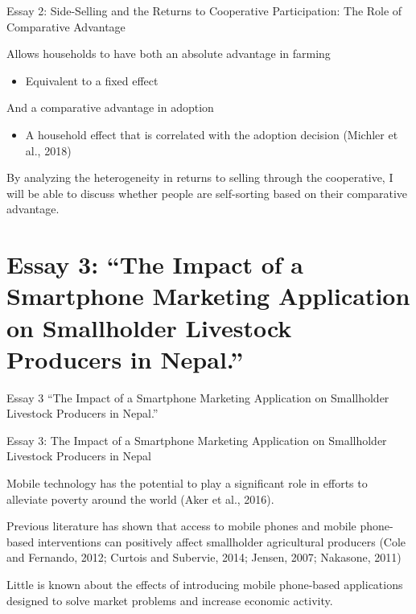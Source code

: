 \documentclass[aspectratio=169]{beamer}
\newenvironment{wideitemize}{\itemize\addtolength{\itemsep}{10pt}}{\enditemize}
\begin{document}
\begin{frame}{Essay 2: Side-Selling and the Returns to Cooperative Participation: The Role of Comparative Advantage}
    \begin{wideitemize}
        \item Allows households to have both an absolute advantage in farming  \vspace{.25cm}
            \begin{itemize}
                \item Equivalent to a fixed effect
            \end{itemize}
        \item And a comparative advantage in adoption  \vspace{.25cm}
            \begin{itemize}
                \item A household effect that is correlated with the adoption decision (Michler et al., 2018)
            \end{itemize}
        \item By analyzing the heterogeneity in returns to selling through the cooperative, I will be able to discuss whether people are self-sorting based on their comparative advantage.    
    \end{wideitemize}
\end{frame}


\section{Essay 3: ``The Impact of a Smartphone Marketing Application on Smallholder Livestock Producers in Nepal.''}

\begin{frame}{Essay 3}
\centering
\Large{``The Impact of a Smartphone Marketing Application on Smallholder Livestock Producers in Nepal.''}
\end{frame}


\begin{frame}{Essay 3: The Impact of a Smartphone Marketing Application on Smallholder Livestock Producers in Nepal}

    \begin{wideitemize}
        \item Mobile technology has the potential to play a significant role in efforts to alleviate poverty
around the world (Aker et al., 2016).
        \item Previous literature has shown that access to mobile phones and mobile phone-based interventions can positively affect smallholder agricultural producers (Cole and Fernando, 2012; Curtois and
        Subervie, 2014; Jensen, 2007; Nakasone, 2011)
        \item Little is known about the effects of introducing mobile phone-based applications designed to solve market problems and increase economic activity.
    \end{wideitemize}
\end{frame}
\end{document}
